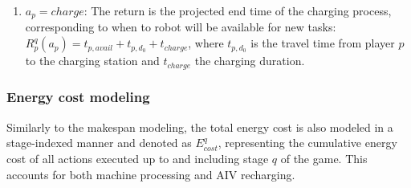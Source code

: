 \documentclass[preprint, 3p, review, 12pt]{elsarticle}
\begin{document}
\begin{itemize}
\begin{enumerate}
\begin{itemize}
            \item if $B_{current} \ge B_{needed}(a_p)$, the action is feasible. The return corresponds to the predicted completion time of the transportation task: $R_p^q(a_p) = t_{p, avail} + \max\{t_{p,i}, t^r_{i,(j-1)}\} + t_{i,d}$.
        \end{itemize}
        \item $a_p = charge$: The return is the projected end time of the charging process, corresponding to when to robot will be available for new tasks: $R_p^q(a_p) = t_{p, avail} + t_{p,d_0} + t_{charge}$, where $t_{p,d_0}$ is the travel time from player $p$ to the charging station and $t_{charge}$ the charging duration.
    \end{enumerate}
\end{itemize}

\subsubsection{Energy cost modeling}
Similarly to the makespan modeling, the total energy cost is also modeled in a stage-indexed manner and denoted as $E_{cost}^{q}$, representing the cumulative energy cost of all actions executed up to and including stage $q$ of the game. This accounts for both machine processing and AIV recharging.  
\end{document}
